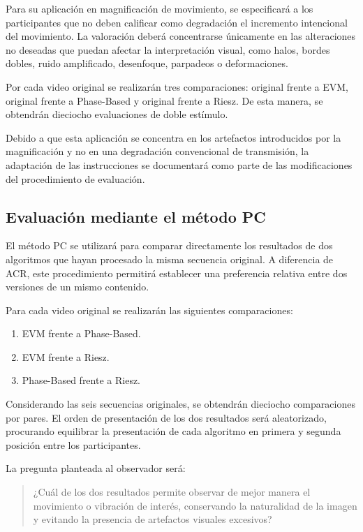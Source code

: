 Para su aplicación en magnificación de movimiento, se especificará a los participantes que no deben calificar como degradación el incremento intencional del movimiento. La valoración deberá concentrarse únicamente en las alteraciones no deseadas que puedan afectar la interpretación visual, como halos, bordes dobles, ruido amplificado, desenfoque, parpadeos o deformaciones.

Por cada video original se realizarán tres comparaciones: original frente a EVM, original frente a Phase-Based y original frente a Riesz. De esta manera, se obtendrán dieciocho evaluaciones de doble estímulo.

Debido a que esta aplicación se concentra en los artefactos introducidos por la magnificación y no en una degradación convencional de transmisión, la adaptación de las instrucciones se documentará como parte de las modificaciones del procedimiento de evaluación.

\subsection{Evaluación mediante el método PC}

El método \gls{PC} se utilizará para comparar directamente los resultados de dos algoritmos que hayan procesado la misma secuencia original. A diferencia de ACR, este procedimiento permitirá establecer una preferencia relativa entre dos versiones de un mismo contenido.

Para cada video original se realizarán las siguientes comparaciones:

\begin{enumerate}
\item EVM frente a Phase-Based.
\item EVM frente a Riesz.
\item Phase-Based frente a Riesz.
\end{enumerate}

Considerando las seis secuencias originales, se obtendrán dieciocho comparaciones por pares. El orden de presentación de los dos resultados será aleatorizado, procurando equilibrar la presentación de cada algoritmo en primera y segunda posición entre los participantes.

La pregunta planteada al observador será:

\begin{quote}
¿Cuál de los dos resultados permite observar de mejor manera el movimiento o vibración de interés, conservando la naturalidad de la imagen y evitando la presencia de artefactos visuales excesivos?
\end{quote}

